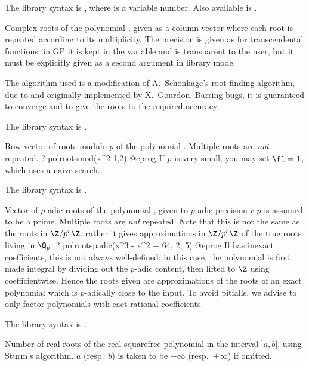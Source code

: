 The library syntax is , where  is a variable number.
Also available is
.

\label{se:polroots}
Complex roots of the polynomial
, given as a column vector where each root is repeated according to
its multiplicity. The precision is given as for transcendental functions: in
GP it is kept in the variable  and is transparent to the
user, but it must be explicitly given as a second argument in library mode.

The algorithm used is a modification of A.~Sch\"onhage's
root-finding algorithm, due to and originally implemented by X.~Gourdon.
Barring bugs, it is guaranteed to converge and to give the roots to the
required accuracy.

The library syntax is .

\label{se:polrootsmod}
Row vector of roots modulo $p$ of the polynomial .
Multiple roots are \emph{not} repeated.
\bprog
? polrootsmod(x^2-1,2)
@eprog\noindent
If $p$ is very small, you may set $\fl=1$, which uses a naive search.

The library syntax is .

\label{se:polrootspadic}
Vector of $p$-adic roots of the polynomial , given to
$p$-adic precision $r$ $p$ is assumed to be a prime. Multiple roots are
\emph{not} repeated. Note that this is not the same as the roots in
$\Z/p^r\Z$, rather it gives approximations in $\Z/p^r\Z$ of the true roots
living in $\Q_p$.
\bprog
? polrootspadic(x^3 - x^2 + 64, 2, 5)
@eprog
If  has inexact  coefficients, this is not always
well-defined; in this case, the polynomial is first made integral by dividing
out the $p$-adic content, then lifted
to $\Z$ using  coefficientwise. Hence the roots given are
approximations of the roots of an exact polynomial which is $p$-adically
close to the input. To avoid pitfalls, we advise to only factor polynomials
with eact rational coefficients.

The library syntax is .

\label{se:polsturm}
Number of real roots of the real squarefree polynomial  in the
interval $]a,b]$, using Sturm's algorithm. $a$ (resp.~$b$) is taken to be
$-\infty$ (resp.~$+\infty$) if omitted.

